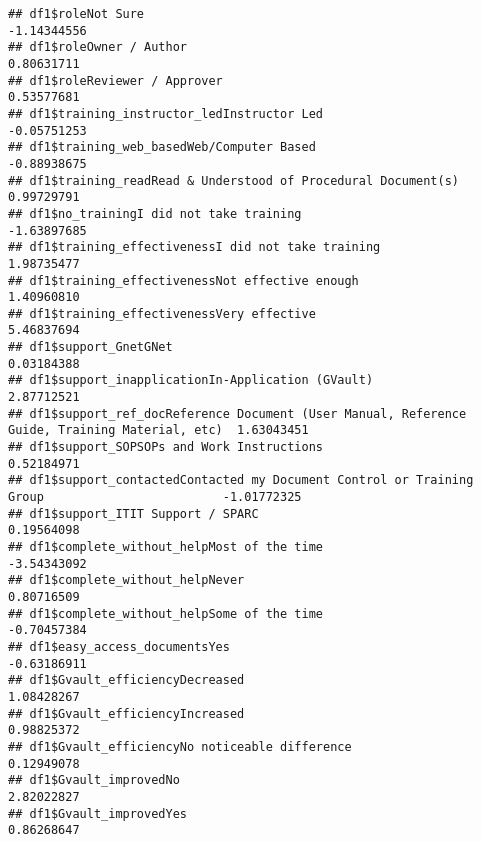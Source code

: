 \documentclass[]{article}
\begin{document}
\begin{verbatim}
## df1$roleNot Sure                                                                             -1.14344556
## df1$roleOwner / Author                                                                        0.80631711
## df1$roleReviewer / Approver                                                                   0.53577681
## df1$training_instructor_ledInstructor Led                                                    -0.05751253
## df1$training_web_basedWeb/Computer Based                                                     -0.88938675
## df1$training_readRead & Understood of Procedural Document(s)                                  0.99729791
## df1$no_trainingI did not take training                                                       -1.63897685
## df1$training_effectivenessI did not take training                                             1.98735477
## df1$training_effectivenessNot effective enough                                                1.40960810
## df1$training_effectivenessVery effective                                                      5.46837694
## df1$support_GnetGNet                                                                          0.03184388
## df1$support_inapplicationIn-Application (GVault)                                              2.87712521
## df1$support_ref_docReference Document (User Manual, Reference Guide, Training Material, etc)  1.63043451
## df1$support_SOPSOPs and Work Instructions                                                     0.52184971
## df1$support_contactedContacted my Document Control or Training Group                         -1.01772325
## df1$support_ITIT Support / SPARC                                                              0.19564098
## df1$complete_without_helpMost of the time                                                    -3.54343092
## df1$complete_without_helpNever                                                                0.80716509
## df1$complete_without_helpSome of the time                                                    -0.70457384
## df1$easy_access_documentsYes                                                                 -0.63186911
## df1$Gvault_efficiencyDecreased                                                                1.08428267
## df1$Gvault_efficiencyIncreased                                                                0.98825372
## df1$Gvault_efficiencyNo noticeable difference                                                 0.12949078
## df1$Gvault_improvedNo                                                                         2.82022827
## df1$Gvault_improvedYes                                                                        0.86268647

\end{verbatim}
\end{document}

